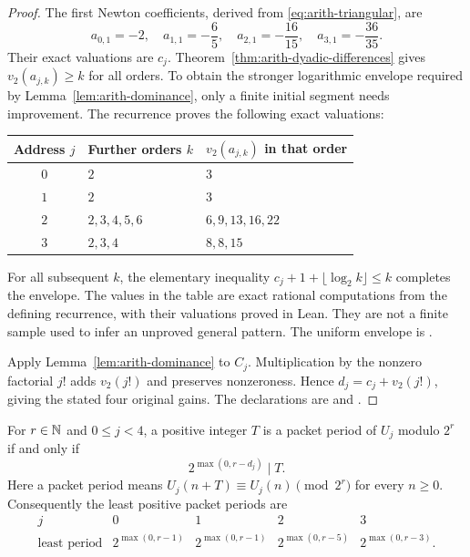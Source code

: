 \begin{proof}
The first Newton coefficients, derived from
\eqref{eq:arith-triangular}, are
\[
 a_{0,1}=-2,\quad a_{1,1}=-\frac65,\quad
 a_{2,1}=-\frac{16}{15},\quad a_{3,1}=-\frac{36}{35}.
\]
Their exact valuations are $c_j$.  Theorem~\ref{thm:arith-dyadic-differences}
gives $v_2(a_{j,k})\ge k$ for all orders.  To obtain the stronger
logarithmic envelope required by Lemma~\ref{lem:arith-dominance}, only
a finite initial segment needs improvement.  The recurrence proves the
following exact valuations:
\begin{center}
\begin{tabular}{cll}\toprule
Address $j$ & Further orders $k$ & $v_2(a_{j,k})$ in that order\\\midrule
$0$ & $2$ & $3$\\
$1$ & $2$ & $3$\\
$2$ & $2,3,4,5,6$ & $6,9,13,16,22$\\
$3$ & $2,3,4$ & $8,8,15$\\\bottomrule
\end{tabular}
\end{center}
For all subsequent $k$, the elementary inequality
$c_j+1+\lfloor\log_2k\rfloor\le k$ completes the envelope.
The values in the table are exact rational computations from the defining
recurrence, with their valuations proved in Lean.  They are not a
finite sample used to infer an unproved general pattern.
The uniform envelope is
.

Apply Lemma~\ref{lem:arith-dominance} to $C_j$.  Multiplication by the
nonzero factorial $j!$ adds $v_2(j!)$ and preserves nonzeroness.
Hence $d_j=c_j+v_2(j!)$, giving the stated four original gains.
The declarations are
and .
\end{proof}

\begin{corollary}
\label{cor:arith-least-period}
For $r\in\mathbb N$ and $0\le j<4$, a positive integer $T$ is a packet period
of $U_j$ modulo $2^r$ if and only if
\[
 2^{\max(0,r-d_j)}\mid T.
\]
Here a packet period means $U_j(n+T)\equiv U_j(n)\pmod{2^r}$ for every
$n\ge0$.  Consequently the least positive packet periods are
\[
 \begin{array}{c|cccc}
 j&0&1&2&3\\\hline
 \text{least period}&2^{\max(0,r-1)}&2^{\max(0,r-1)}&
                 2^{\max(0,r-5)}&2^{\max(0,r-3)}.
 \end{array}
\]
\end{corollary}

